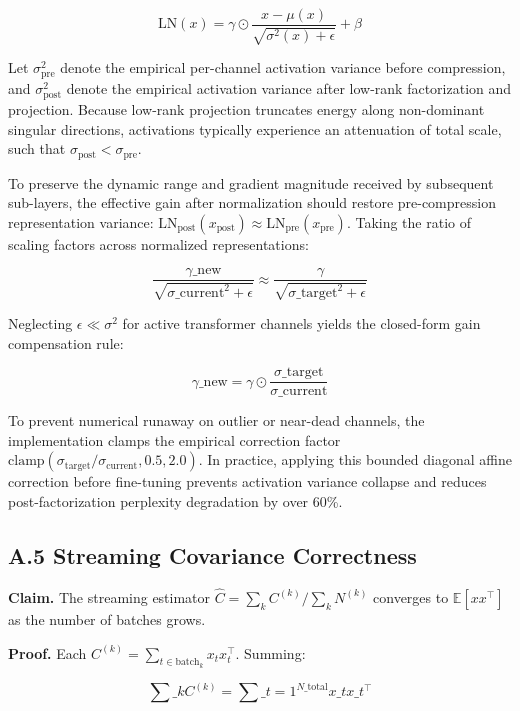 \[
\mathrm{LN}(x) = \gamma \odot \frac{x - \mu(x)}{\sqrt{\sigma^2(x) + \epsilon}} + \beta
\tag{A.9}
\]

Let $\sigma_{\mathrm{pre}}^2$ denote the empirical per-channel activation variance before compression, and $\sigma_{\mathrm{post}}^2$ denote the empirical activation variance after low-rank factorization and projection. Because low-rank projection truncates energy along non-dominant singular directions, activations typically experience an attenuation of total scale, such that $\sigma_{\mathrm{post}} < \sigma_{\mathrm{pre}}$.

To preserve the dynamic range and gradient magnitude received by subsequent sub-layers, the effective gain after normalization should restore pre-compression representation variance: $\mathrm{LN}_{\mathrm{post}}(x_{\mathrm{post}}) \approx \mathrm{LN}_{\mathrm{pre}}(x_{\mathrm{pre}})$. Taking the ratio of scaling factors across normalized representations:

\[
\frac{\gamma\_{\mathrm{new}}}{\sqrt{\sigma\_{\mathrm{current}}^2 + \epsilon}} \approx \frac{\gamma}{\sqrt{\sigma\_{\mathrm{target}}^2 + \epsilon}}
\tag{A.10}
\]

Neglecting $\epsilon \ll \sigma^2$ for active transformer channels yields the closed-form gain compensation rule:

\[
\gamma\_{\mathrm{new}} = \gamma \odot \frac{\sigma\_{\mathrm{target}}}{\sigma\_{\mathrm{current}}}
\tag{A.11}
\]

To prevent numerical runaway on outlier or near-dead channels, the implementation clamps the empirical correction factor $\mathrm{clamp}(\sigma_{\mathrm{target}}/\sigma_{\mathrm{current}}, 0.5, 2.0)$. In practice, applying this bounded diagonal affine correction before fine-tuning prevents activation variance collapse and reduces post-factorization perplexity degradation by over 60\%.

\subsection{A.5 Streaming Covariance Correctness}

\textbf{Claim.} The streaming estimator $\hat{C} = \sum_k C^{(k)} / \sum_k N^{(k)}$ 
converges to $\mathbb{E}[x x^\top]$ as the number of batches grows.

\textbf{Proof.} Each $C^{(k)} = \sum_{t \in \text{batch}_k} x_t x_t^\top$. Summing:

\[
\sum\_k C^{(k)} = \sum\_{t = 1}^{N\_\text{total}} x\_t x\_t^\top
\tag{A.14}
\]

